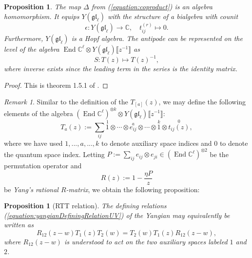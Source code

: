 \documentclass[11pt]{report}
\newtheorem{prop}[theorem]{Proposition}
\theoremstyle{definition}
\theoremstyle{remark}
\newtheorem*{remark}{Remark}
\theoremstyle{remark}
\newcommand{\End}{\operatorname{End}}
\newcommand{\C}{\mathbb{C}}
\begin{document}
\begin{prop}
The map $\Delta$ from (\ref{equation:coproduct}) is an algebra homomorphism. It equips $Y(\mathfrak{gl}_\ell)$ with the structure of a bialgebra with counit
\begin{equation*}
\epsilon: Y(\mathfrak{gl}_\ell) \to \C, \quad t_{ij}^{(r)} \mapsto 0.
\end{equation*}
Furthermore, $Y(\mathfrak{gl}_\ell)$ is a Hopf algebra. The antipode can be represented on the level of the algebra $\End \C^\ell \otimes Y(\mathfrak{gl}_\ell)\llbracket z^{-1} \rrbracket$ as
\begin{equation*}
S: T(z) \mapsto T(z)^{-1},
\end{equation*}
where inverse exists since the leading term in the series is the identity matrix.
\end{prop}

\begin{proof}
This is theorem 1.5.1 of \cite{book:molev}.
\end{proof}

\begin{remark}
Similar to the definition of the $T_{[a]}(z)$, we may define the following elements of the algebra $(\End \C^\ell)^{\otimes k} \otimes Y(\mathfrak{gl}_\ell)\llbracket z^{-1} \rrbracket$:
\begin{equation*}
T_a(z) := \sum_{ij} \overset{1}{1} \otimes \cdots \otimes \overset{a}{e_{ij}} \otimes \cdots \otimes \overset{k}{1} \otimes \overset{0}{t_{ij}(z)},
\end{equation*}
where we have used $1,...,a,...,k$ to denote auxiliary space indices and $0$ to denote the quantum space index. Letting $P := \sum_{ij} e_{ij} \otimes e_{ji} \in (\End \C^\ell)^{\otimes 2}$ be the permutation operator and
\begin{equation*}
R(z) := 1 - \frac{\eta P}{z}
\end{equation*}
be \emph{Yang's rational $R$-matrix}, we obtain the following proposition:
\end{remark}

\begin{prop}[RTT relation]
The defining relations (\ref{equation:yangianDefiningRelationUV}) of the Yangian may equivalently be written as
\begin{equation}\label{equation:RTTRelation}
R_{12}(z-w) T_1(z) T_2(w) = T_2(w) T_1(z) R_{12}(z-w),
\end{equation}
where $R_{12}(z-w)$ is understood to act on the two auxiliary spaces labeled $1$ and $2$.
\end{prop}
\end{document}
